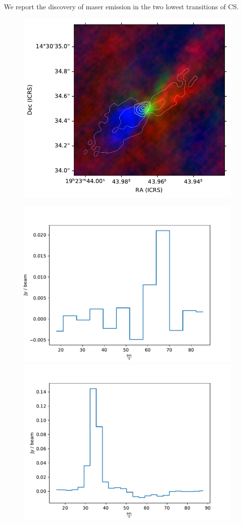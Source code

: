 

We report the discovery of maser emission in the two lowest transitions of CS.

\begin{figure}
    \includegraphics{figures/W51e2e_sio_outflow_with_CS_contours.pdf}
\end{figure}

\begin{figure}
\includegraphics{figures/CS1-0_maser_Jy.pdf}
\includegraphics{figures/CS2-1_maser_Jy.pdf}
\end{figure}


